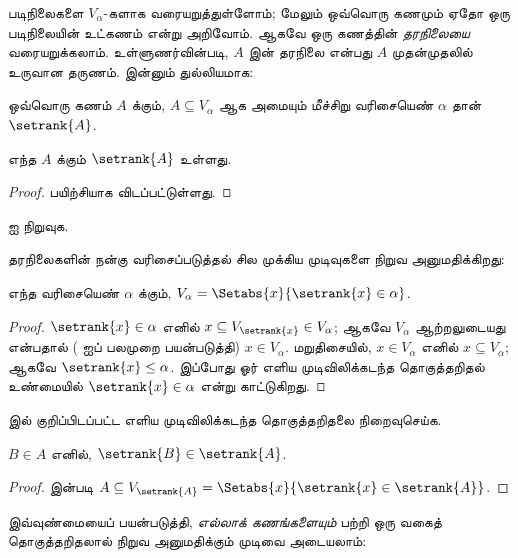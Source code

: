 \documentclass[../../../include/open-logic-section]{subfiles}
\begin{document}

படிநிலைகளை $V_\alpha$-களாக வரையறுத்துள்ளோம்; மேலும் ஒவ்வொரு கணமும்
ஏதோ ஒரு படிநிலையின் உட்கணம் என்று அறிவோம். ஆகவே ஒரு கணத்தின்
\emph{தரநிலையை} வரையறுக்கலாம். உள்ளுணர்வின்படி, $A$ இன் தரநிலை என்பது
$A$ முதன்முதலில் உருவான தருணம். இன்னும் துல்லியமாக:

\begin{defn}
ஒவ்வொரு கணம் $A$ க்கும், $A \subseteq V_\alpha$ ஆக அமையும் மீச்சிறு
வரிசையெண் $\alpha$ தான் $\setrank{A}$.
\end{defn}
\begin{prop}
	எந்த $A$ க்கும் $\setrank{A}$ உள்ளது.
\end{prop}
\begin{proof}
	பயிற்சியாக விடப்பட்டுள்ளது.
\end{proof}
\begin{prob}
	 ஐ நிறுவுக.
\end{prob}
\noindent
தரநிலைகளின் நன்கு வரிசைப்படுத்தல் சில முக்கிய முடிவுகளை நிறுவ
அனுமதிக்கிறது:
\begin{prop}
எந்த வரிசையெண் $\alpha$ க்கும்,
$V_\alpha = \Setabs{x}{\setrank{x} \in \alpha}$.
\end{prop}

\begin{proof}
$\setrank{x} \in \alpha$ எனில் $x \subseteq V_{\setrank{x}} \in
V_\alpha$; ஆகவே $V_\alpha$ ஆற்றலுடையது என்பதால்
( ஐப் பலமுறை பயன்படுத்தி)
$x \in V_\alpha$. மறுதிசையில், $x \in V_\alpha$ எனில்
$x \subseteq V_\alpha$; ஆகவே $\setrank{x} \leq \alpha$.
இப்போது ஓர் எளிய முடிவிலிக்கடந்த தொகுத்தறிதல் உண்மையில்
$\setrank{x} \in \alpha$ என்று காட்டுகிறது.
\end{proof}
\begin{prob}
	 இல் குறிப்பிடப்பட்ட எளிய
	முடிவிலிக்கடந்த தொகுத்தறிதலை நிறைவுசெய்க.
\end{prob}

\begin{prop}
$B \in A$ எனில், $\setrank{B} \in \setrank{A}$.
\end{prop}

\begin{proof}
 இன்படி
$A \subseteq V_{\setrank{A}} = \Setabs{x}{\setrank{x} \in
\setrank{A}}$.
\end{proof}
\noindent
இவ்வுண்மையைப் பயன்படுத்தி, \emph{எல்லாக் கணங்களையும்} பற்றி ஒரு வகைத்
தொகுத்தறிதலால் நிறுவ அனுமதிக்கும் முடிவை அடையலாம்:
\end{document}
